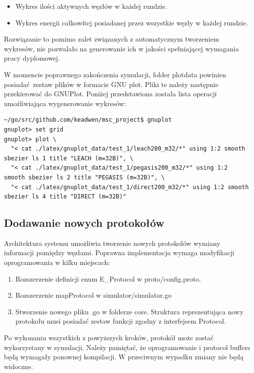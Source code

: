 \documentclass[a4paper,12pt,twoside,openany]{report}
\begin{document}
\begin{itemize}
 \item Wykres ilości aktywnych węzłów w każdej rundzie.
 \item Wykres energii całkowitej posiadanej przez wszystkie węzły w każdej rundzie.
\end{itemize}

Rozwiązanie to pomimo zalet związanych z automatycznym tworzeniem wykresów, nie pozwalało na generowanie ich w jakości spełniającej
wymagania pracy dyplomowej.

W momencie poprawnego zakończenia symulacji, folder plotdata powinien posiadać zestaw plików w formacie GNU plot.
Pliki te należy następnie przekierować do GNUPlot. Poniżej przedstawiona została lista operacji umożliwiająca wygenerowanie wykresów:

\begin{lstlisting}
~/go/src/github.com/keadwen/msc_project$ gnuplot
gnuplot> set grid
gnuplot> plot \
  "< cat ./latex/gnuplot_data/test_1/leach200_m32/*" using 1:2 smooth sbezier ls 1 title "LEACH (m=32B)", \
  "< cat ./latex/gnuplot_data/test_1/pegasis200_m32/*" using 1:2 smooth sbezier ls 2 title "PEGASIS (m=32B)", \
  "< cat ./latex/gnuplot_data/test_1/direct200_m32/*" using 1:2 smooth sbezier ls 4 title "DIRECT (m=32B)"
\end{lstlisting}

\subsection{Dodawanie nowych protokołów}

Architektura systemu umożliwia tworzenie nowych protokołów wymiany informacji pomiędzy węzłami.
Poprawna implementacja wymaga modyfikacji oprogramowania w kilku miejscach:

\begin{enumerate}
 \item Rozszerzenie definicji enum E\_Protocol w proto/config.proto.
 \item Rozszerzenie mapProtocol w simulator/simulator.go
 \item Stworzenie nowego pliku .go w folderze core. Struktura reprezentująca nowy protokołu musi posiadać zestaw funkcji zgodny z interfejsem Protocol.
\end{enumerate}

Po wykonaniu wszystkich z powyższych kroków, protokół może zostać wykorzystany w symulacji.
Należy pamiętać, że oprogramowanie i protocol buffers będą wymagały ponownej kompilacji. W przeciwnym wypadku zmiany nie będą widoczne.
\end{document}
